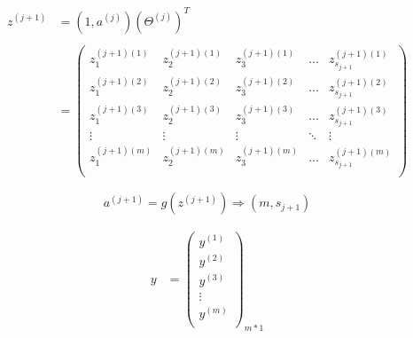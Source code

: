 \begin{equation}\begin{aligned}
	z^{(j+1)} &= (1, a^{(j)}) (\Theta^{(j)})^T \\
		\\ &= 
			\left(\begin{matrix}
				z_1^{(j+1)(1)} & z_2^{(j+1)(1)} & z_3^{(j+1)(1)} & \dots & z_{s_{j+1}}^{(j+1)(1)} \\
				z_1^{(j+1)(2)} & z_2^{(j+1)(2)} & z_3^{(j+1)(2)} & \dots & z_{s_{j+1}}^{(j+1)(2)} \\
				z_1^{(j+1)(3)} & z_2^{(j+1)(3)} & z_3^{(j+1)(3)} & \dots & z_{s_{j+1}}^{(j+1)(3)} \\
				\vdots & \vdots & \vdots & \ddots & \vdots \\
				z_1^{(j+1)(m)} & z_2^{(j+1)(m)} & z_3^{(j+1)(m)} & \dots & z_{s_{j+1}}^{(j+1)(m)} \\
			\end{matrix}\right)
\end{aligned}\end{equation}

\begin{equation}
	a^{(j+1)} = g(z^{(j+1)})  \Rightarrow {(m,s_{j+1})} 
\end{equation}


\begin{equation} \begin{aligned}
	y & = \left(\begin{matrix}
			y^{(1)} \\ y^{(2)} \\ y^{(3)} \\ \vdots \\ y^{(m)} \\
		\end{matrix}\right)_{m*1}
\end{aligned} \end{equation}
